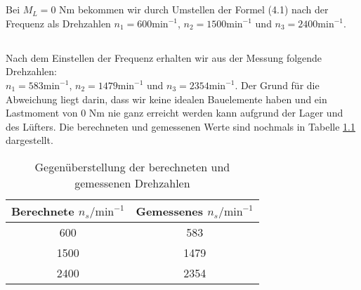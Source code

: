 \chapter{}\label{ex:aufg5}
%
\section{}\label{sec:aufg5a}
%
Bei $M_L = 0$ Nm bekommen wir durch Umstellen der Formel (4.1) nach der Frequenz als Drehzahlen $n_1 = 600 \text{min}^{-1}$, $n_2 = 1500 \text{min}^{-1}$ und $n_3 = 2400 \text{min}^{-1}$.
\section{}\label{sec:aufg5b}
%
Nach dem Einstellen der Frequenz erhalten wir aus der Messung folgende Drehzahlen:\\
$n_1 = 583 \text{min}^{-1}$, $n_2 = 1479 \text{min}^{-1}$ und $n_3 = 2354 \text{min}^{-1}$.
Der Grund für die Abweichung liegt darin, dass wir keine idealen Bauelemente haben und ein Lastmoment von 0 Nm nie ganz erreicht werden kann aufgrund der Lager und des Lüfters. Die berechneten und gemessenen Werte sind nochmals in Tabelle \ref{tab:drehzahlen} dargestellt.
\begin{table}[htb]
	\centering
	\begin{tabular}{c | c}
		Berechnete $n_s/\text{min}^{-1}$ & Gemessenes $n_s/\text{min}^{-1}$\\\hline
		600 &  583 \\ 
		1500 & 1479 \\ 
		2400 & 2354
	\end{tabular} 
	\caption{Gegenüberstellung der berechneten und gemessenen Drehzahlen}
	\label{tab:drehzahlen}
\end{table}
	
	
